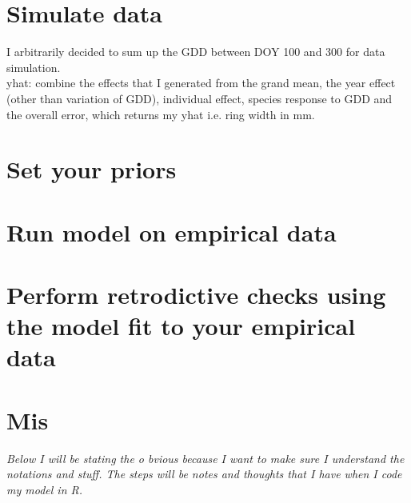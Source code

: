 \documentclass[a4paper,12pt]{article}
\begin{document}
\section{Simulate data}
I arbitrarily decided to sum up the GDD between DOY 100 and 300 for data simulation. \\
yhat: combine the effects that I generated from the grand mean, the year effect (other than variation of GDD), individual effect, species response to GDD and the overall error, which returns my yhat i.e. ring width in mm.

\section{Set your priors}

\section{Run model on empirical data}

\section{Perform retrodictive checks using the model fit to your empirical data}

\section{Mis}

\newpage
\textit{Below I will be stating the o bvious because I want to make sure I understand the notations and stuff. The steps will be notes and thoughts that I have when I code my model in R.}
\end{document}
